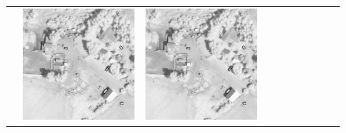 \begin{figure}[h!]
\begin{tabularx}{\textwidth}{c|*{9}{X}}
    & \includegraphics[trim={730pt 220pt 200pt 720pt},clip,width=\linewidth]{images/015Results/03ablation/comp_images/ground_truth/523.png}
    & \includegraphics[trim={850pt 110pt 80pt 830pt},clip,width=\linewidth]{images/015Results/03ablation/comp_images/ground_truth/523.png}

\end{tabularx}
\end{figure}
